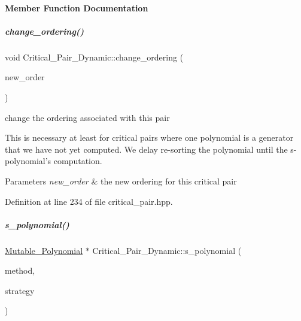\paragraph{Member Function Documentation}
\mbox{\label{group___g_b_computation_aa9001ca49b2c2fd7d39384e4e70c5a6b}} 
\subparagraph{\texorpdfstring{change\+\_\+ordering()}{change\_ordering()}}
{\footnotesize\ttfamily void Critical\+\_\+\+Pair\+\_\+\+Dynamic\+::change\+\_\+ordering (\begin{DoxyParamCaption}\item[{\hyperlink{group__orderinggroup_class_weighted___ordering}{Weighted\+\_\+\+Ordering} $\ast$}]{new\+\_\+order }\end{DoxyParamCaption})\hspace{0.3cm}{\ttfamily [inline]}}



change the ordering associated with this pair 

This is necessary at least for critical pairs where one polynomial is a generator that we have not yet computed. We delay re-\/sorting the polynomial until the s-\/polynomial's computation. 
\begin{DoxyParams}{Parameters}
{\em new\+\_\+order} & the new ordering for this critical pair \\
\hline
\end{DoxyParams}


Definition at line 234 of file critical\+\_\+pair.\+hpp.

\mbox{\label{group___g_b_computation_a3146fa294ea814d5388e09b1c76c966b}} 
\subparagraph{\texorpdfstring{s\+\_\+polynomial()}{s\_polynomial()}}
{\footnotesize\ttfamily \hyperlink{group__polygroup_class_mutable___polynomial}{Mutable\+\_\+\+Polynomial} $\ast$ Critical\+\_\+\+Pair\+\_\+\+Dynamic\+::s\+\_\+polynomial (\begin{DoxyParamCaption}\item[{\hyperlink{group___g_b_computation_ga73257b8a2d5cc826853a71b77d0cebf2}{S\+Poly\+Creation\+Flags}}]{method,  }\item[{\hyperlink{group__strategygroup_ga0ee6c8e033547330e6b89929730007f4}{Strategy\+Flags}}]{strategy }\end{DoxyParamCaption})\hspace{0.3cm}{\ttfamily [virtual]}}



